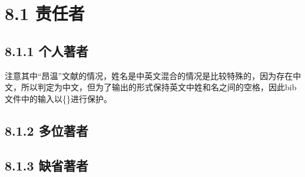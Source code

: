 \documentclass{article}
\begin{document}
\begin{refsection}
\nocite{DUBAR2013--}
\nocite{余建斌2013--}
\nocite{Bawden2008--}
\printbibliography[heading=subbibliography,title={符号()示例}]
\end{refsection}

\begin{refsection}
\nocite{DUBAR2013--}
\printbibliography[heading=subbibliography,title={符号{[}{]}示例}]
\end{refsection}

\begin{refsection}
\nocite{Dowler1995-5-26}
\nocite{DUBAR2013--}
\printbibliography[heading=subbibliography,title={符号/示例}]
\end{refsection}

\begin{refsection}
\nocite{Dowler1995-5-26}
\nocite{DUBAR2013--}
\printbibliography[heading=subbibliography,title={符号-示例}]
\end{refsection}


\section*{8.1 责任者}
\subsection*{8.1.1 个人著者}
\begin{refsection}
注意其中“昂温”文献的情况，姓名是中英文混合的情况是比较特殊的，因为存在中文，所以判定为中文，但为了输出的形式保持英文中姓和名之间的空格，因此bib文件中的输入以\{\}进行保护。
\nocite{李时珍--}
\nocite{乔纳斯--}
\nocite{昂温1988--}
\nocite{GPS1988--}
\nocite{丸山敏秋--}
\nocite{凯西尔--}
\nocite{Einstein--}
\nocite{Williams-ellis--}
\nocite{morgan--}
\nocite{lijianning--a}
\nocite{lijianning--b}
\end{refsection}

\subsection*{8.1.2 多位著者}
\begin{refsection}
\nocite{钱学森--}
\nocite{李四光--}
\nocite{印森林--}
\nocite{fordham--}
\end{refsection}

\subsection*{8.1.3 缺省著者}
\begin{refsection}
\nocite{anon1981-628}
\printbibliography[heading=subbibliography,title={作者姓名示例}]
\end{refsection}
\end{document}
